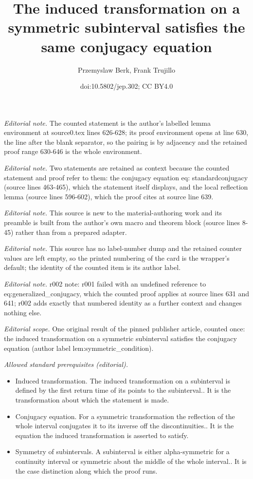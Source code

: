 \documentclass[10pt,a4paper]{article}
\title{The induced transformation on a symmetric subinterval satisfies the same conjugacy equation}
\author{Przemyslaw Berk, Frank Trujillo}
\date{doi:10.5802/jep.302; CC BY4.0}
\theoremstyle{plain}
\theoremstyle{definition}
\begin{document}
\maketitle
\noindent\textit{Editorial note.} The counted statement is the author's labelled lemma environment at source0.tex lines 626-628; its proof environment opens at line 630, the line after the blank separator, so the pairing is by adjacency and the retained proof range 630-646 is the whole environment.\par\medskip
\noindent\textit{Editorial note.} Two statements are retained as context because the counted statement and proof refer to them: the conjugacy equation eq: standardconjugacy (source lines 463-465), which the statement itself displays, and the local reflection lemma (source lines 596-602), which the proof cites at source line 639.\par\medskip
\noindent\textit{Editorial note.} This source is new to the material-authoring work and its preamble is built from the author's own macro and theorem block (source lines 8-45) rather than from a prepared adapter.\par\medskip
\noindent\textit{Editorial note.} This source has no label-number dump and the retained counter values are left empty, so the printed numbering of the card is the wrapper's default; the identity of the counted item is its author label.\par\medskip
\noindent\textit{Editorial note.} r002 note: r001 failed with an undefined reference to eq:generalized\_conjugacy, which the counted proof applies at source lines 631 and 641; r002 adds exactly that numbered identity as a further context and changes nothing else.\par\medskip
\noindent\textit{Editorial scope.} One original result of the pinned publisher article, counted once: the induced transformation on a symmetric subinterval satisfies the conjugacy equation (author label lem:symmetric\_condition).\par\medskip
\noindent\textit{Allowed standard prerequisites (editorial).}\begin{itemize}
\item Induced transformation. The induced transformation on a subinterval is defined by the first return time of its points to the subinterval.. It is the transformation about which the statement is made.
\item Conjugacy equation. For a symmetric transformation the reflection of the whole interval conjugates it to its inverse off the discontinuities.. It is the equation the induced transformation is asserted to satisfy.
\item Symmetry of subintervals. A subinterval is either alpha-symmetric for a continuity interval or symmetric about the middle of the whole interval.. It is the case distinction along which the proof runs.
\end{itemize}\medskip
\end{document}
